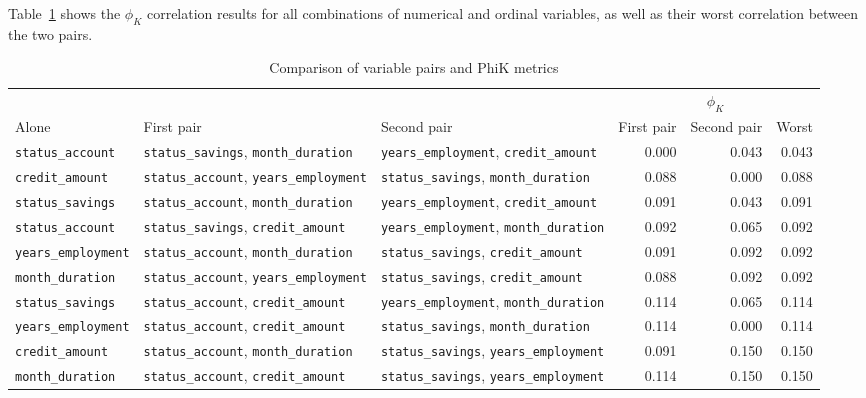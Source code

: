 \documentclass{ieeeaccess}
\begin{document}
Table~\ref{tab:phik_numerical_ordinal} shows the $\phi_{K}$ correlation results for all combinations of numerical and ordinal variables, as well as their worst correlation between the two pairs.

\begin{table}[htbp]
  \caption{Comparison of variable pairs and PhiK metrics}
  \label{tab:phik_numerical_ordinal}
  \centering
  \setlength{\tabcolsep}{4pt}
  \begin{tabular}{@{}lllrrr@{}}
  \toprule
   & & & \multicolumn{3}{c}{$\phi_K$} \\
  \cmidrule(l){4-6}
  Alone & First pair & Second pair & First pair & Second pair & Worst \\
  \midrule
  \texttt{status\_account} & \texttt{status\_savings}, \texttt{month\_duration} & \texttt{years\_employment}, \texttt{credit\_amount} & 0.000 & 0.043 & 0.043 \\
  \texttt{credit\_amount} & \texttt{status\_account}, \texttt{years\_employment} & \texttt{status\_savings}, \texttt{month\_duration} & 0.088 & 0.000 & 0.088 \\
  \texttt{status\_savings} & \texttt{status\_account}, \texttt{month\_duration} & \texttt{years\_employment}, \texttt{credit\_amount} & 0.091 & 0.043 & 0.091 \\
  \texttt{status\_account} & \texttt{status\_savings}, \texttt{credit\_amount} & \texttt{years\_employment}, \texttt{month\_duration} & 0.092 & 0.065 & 0.092 \\
  \texttt{years\_employment} & \texttt{status\_account}, \texttt{month\_duration} & \texttt{status\_savings}, \texttt{credit\_amount} & 0.091 & 0.092 & 0.092 \\
  \texttt{month\_duration} & \texttt{status\_account}, \texttt{years\_employment} & \texttt{status\_savings}, \texttt{credit\_amount} & 0.088 & 0.092 & 0.092 \\
  \texttt{status\_savings} & \texttt{status\_account}, \texttt{credit\_amount} & \texttt{years\_employment}, \texttt{month\_duration} & 0.114 & 0.065 & 0.114 \\
  \texttt{years\_employment} & \texttt{status\_account}, \texttt{credit\_amount} & \texttt{status\_savings}, \texttt{month\_duration} & 0.114 & 0.000 & 0.114 \\
  \texttt{credit\_amount} & \texttt{status\_account}, \texttt{month\_duration} & \texttt{status\_savings}, \texttt{years\_employment} & 0.091 & 0.150 & 0.150 \\
  \texttt{month\_duration} & \texttt{status\_account}, \texttt{credit\_amount} & \texttt{status\_savings}, \texttt{years\_employment} & 0.114 & 0.150 & 0.150 \\

\end{tabular}
\end{table}
\end{document}
